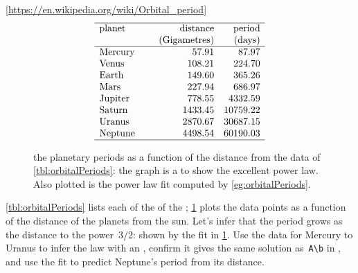 \begin{example} \label{eg:orbitalPeriods}
\begin{table}
\caption{orbital periods for the eight  of the : the periods are in (Earth) days; the distance is the length of the semi-major axis of the orbits (, 2014).
Used by \cref{eg:orbitalPeriods}.}
\label{tbl:orbitalPeriods}
{\footnotesize[\protect\url{https://en.wikipedia.org/wiki/Orbital\_period}]}
\begin{equation*}
\begin{array}{p{12ex}rr} \hline
planet&\text{distance}&\text{period}\\
&\text{(Gigametres)}&\text{(days)}\\\hline
Mercury& 57.91 & 87.97 \\
Venus& 108.21 & 224.70 \\
Earth& 149.60& 365.26\\
Mars& 227.94& 686.97\\
Jupiter& 778.55& 4332.59\\
Saturn& 1433.45& 10759.22\\
Uranus& 2870.67& 30687.15\\
Neptune& 4498.54& 60190.03\\\hline
\end{array}
\end{equation*}
\end{table}%
\begin{figure}
\centering

\caption{the planetary periods as a function of the distance from the data of \cref{tbl:orbitalPeriods}: the graph is a  to show the excellent power law.  
Also plotted is the power law fit computed by \cref{eg:orbitalPeriods}.}
\label{fig:orbitalPeriods}
\end{figure}%
\cref{tbl:orbitalPeriods} lists each  of the  of the ; \cref{fig:orbitalPeriods} plots the data points as a function of the distance of the planets from the sun.
Let's infer  that the period grows as the distance to the power~\(3/2\): shown by the  fit in \cref{fig:orbitalPeriods}.
Use the data for Mercury to Uranus to infer the law with an \svd, confirm it gives the same solution as~\verb|A\b| in \script, and use the fit to predict Neptune's period from its distance.
\begin{solution} 

\end{solution}
\end{example}
